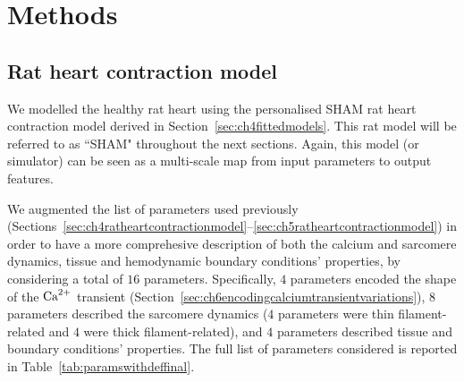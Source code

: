 %
%
%
\section{Methods}\label{sec:ch7methods}


%
%
%
\subsection{Rat heart contraction model}\label{sec:ratmodel}
We modelled the healthy rat heart using the personalised SHAM rat heart contraction model derived in Section~\ref{sec:ch4fittedmodels}. This rat model will be referred to as ``SHAM" throughout the next sections. Again, this model (or simulator) can be seen as a multi-scale map from input parameters to output features.


\vspace{0.2cm}
We augmented the list of parameters used previously (Sections~\ref{sec:ch4ratheartcontractionmodel}--\ref{sec:ch5ratheartcontractionmodel}) in order to have a more comprehesive description of both the calcium and sarcomere dynamics, tissue and hemodynamic boundary conditions' properties, by considering a total of $16$ parameters. Specifically, $4$ parameters encoded the shape of the $\textrm{Ca}^{2+}$ transient (Section~\ref{sec:ch6encodingcalciumtransientvariations}), $8$ parameters described the sarcomere dynamics ($4$ parameters were thin filament-related and $4$ were thick filament-related), and $4$ parameters described tissue and boundary conditions' properties. The full list of parameters considered is reported in Table~\ref{tab:paramswithdeffinal}.

